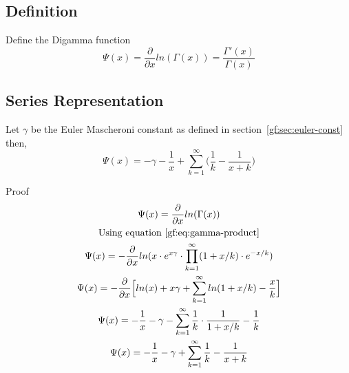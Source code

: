 \documentclass[a4paper]{article}
\begin{document}
    \subsection{Definition}\label{gf:subsec:definition}
    Define the Digamma function
    \begin{equation}
        \label{gf:eq:digamma-def}
        \Psi(x) = \frac{\partial}{\partial x}  ln(\Gamma(x)) = \frac{\Gamma'(x)}{\Gamma(x)}
    \end{equation}

    \subsection{Series Representation}\label{gf:subsec:series-representation}

    \begin{theorem}
        Let $\gamma$ be the Euler Mascheroni constant as defined in section~\ref{gf:sec:euler-const} then,
        \begin{equation}
            \label{gf:eq:psi-series}
            \boxed{
                \Psi(x) = -\gamma - \frac{1}{x} + \sum_{k=1}^{\infty} \Big( \frac{1}{k} - \frac{1}{x+k}  \Big)
            }
        \end{equation}

        Proof
        \\
        \begin{gather*}
            \Psi(x) = \frac{\partial}{\partial x}  ln(\Gamma(x))
            \\
            \text{Using equation~\ref{gf:eq:gamma-product}}
            \\
            \Psi(x) = -\frac{\partial}{\partial x} ln(x \cdot e^{x \gamma} \cdot \prod_{k=1}^{\infty} (1 + x/k) \cdot e^{-x/k})
            \\
            \Psi(x) = -\frac{\partial}{\partial x} \Big[ ln(x) + x \gamma + \sum_{k=1}^{\infty} ln(1 + x/k) - \frac{x}{k}
            \Big]
            \\
            \Psi(x) = -\frac{1}{x}  -  \gamma - \sum_{k=1}^{\infty} \frac{1}{k} \cdot \frac{1}{1 + x/k} - \frac{1}{k}
            \\
            \Psi(x) = -\frac{1}{x}  -  \gamma + \sum_{k=1}^{\infty} \frac{1}{k} - \frac{1}{x + k}
        \end{gather*}
    \end{theorem}
\end{document}
